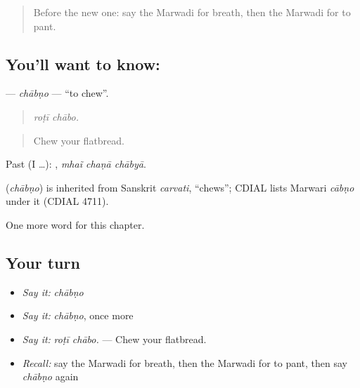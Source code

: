\label{lesson:MW-C252-chabno}



\begin{quote}
Before the new one: say the Marwadi for breath, then the Marwadi for to pant.
\end{quote}

\subsection*{You'll want to know: }
\textbf{} — \emph{chābṇo} — \textquotedblleft{}to chew\textquotedblright{}.

\begin{quote}
 
\end{quote}

\begin{quote}
\emph{roṭī chābo.}
\end{quote}

\begin{quote}
Chew your flatbread.
\end{quote}

Past (I …):   , \emph{mhaĩ chaṇā chābyā}.

\begin{cousinweb}
\textbf{} (\emph{chābṇo}) is inherited from Sanskrit \emph{carvati}, \textquotedblleft{}chews\textquotedblright{}; CDIAL lists Marwari \emph{cābṇo} under it (CDIAL 4711).
\end{cousinweb}

\begin{grammarlens}[title={What you've built}]
One more word for this chapter.
\end{grammarlens}

\subsection*{Your turn}
\begin{itemize}
\raggedright
  \item \emph{Say it:} \emph{chābṇo}
  \item \emph{Say it:} \emph{chābṇo}, once more
  \item \emph{Say it:} \emph{roṭī chābo.} — Chew your flatbread.
  \item \emph{Recall:} say the Marwadi for breath, then the Marwadi for to pant, then say \emph{chābṇo} again
\end{itemize}

